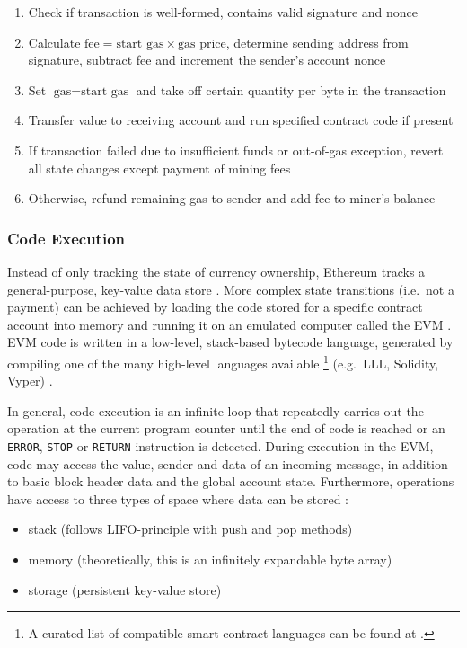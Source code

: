 \begin{enumerate}
  \item Check if transaction is well-formed, contains valid signature and nonce
  \item Calculate $\text{fee} = \text{start gas} \times \text{gas price}$, determine sending address from signature, subtract fee and increment the sender's account nonce
  \item Set $\text{gas} = \text{start gas}$ and take off certain quantity per byte in the transaction
  \item Transfer value to receiving account and run specified contract code if present
  \item If transaction failed due to insufficient funds or out-of-gas exception, revert all state changes except payment of mining fees
  \item Otherwise, refund remaining gas to sender and add fee to miner's balance
\end{enumerate}

\subsubsection{Code Execution}
Instead of only tracking the state of currency ownership, Ethereum tracks a general-purpose, key-value data store \cite[p.~28]{Antonopoulos.2018}. More complex state transitions (i.e.~not a payment) can be achieved by loading the code stored for a specific contract account into memory and running it on an emulated computer called the \ac{EVM} \cite[p.~57]{Antonopoulos.2018}. \ac{EVM} code is written in a low-level, stack-based bytecode language, generated by compiling one of the many high-level languages available \footnote{A curated list of compatible smart-contract languages can be found at \cite{smartContractLanguages}.} (e.g.~LLL, Solidity, Vyper) \cite[p.~22]{ethereumWhitepaperGitHub} \cite[p.~29]{Antonopoulos.2018}. 

In general, code execution is an infinite loop that repeatedly carries out the operation at the current program counter until the end of code is reached or an \texttt{ERROR}, \texttt{STOP} or \texttt{RETURN} instruction is detected. During execution in the \ac{EVM}, code may access the value, sender and data of an incoming message, in addition to basic block header data and the global account state. Furthermore, operations have access to three types of space where data can be stored \cite[p.~22]{ethereumWhitepaperGitHub}:

\begin{itemize}
  \item stack (follows \acs{LIFO}-principle with push and pop methods)
  \item memory (theoretically, this is an infinitely expandable byte array)
  \item storage (persistent key-value store)
\end{itemize}

